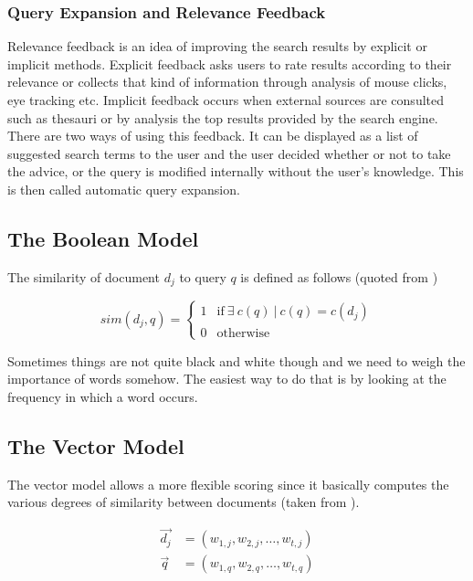 \subsubsection{Query Expansion and Relevance Feedback}

Relevance feedback is an idea of improving the search results by explicit or implicit methods. Explicit feedback asks users to rate results according to their relevance or collects that kind of information through analysis of mouse clicks, eye tracking etc. Implicit feedback occurs when external sources are consulted such as thesauri or by analysis the top results provided by the search engine. There are two ways of using this feedback. It can be displayed as a list of suggested search terms to the user and the user decided whether or not to take the advice, or the query is modified internally without the user's knowledge. This is then called automatic query expansion.

\subsection*{The Boolean Model}

The similarity of document $d_j$ to query $q$ is defined as follows (quoted from \citep[p.65]{Baeza-Yates2011})

\begin{equation}
  sim(d_j,q) =
  \begin{cases}
  1 & \text{if} \ \exists \ c(q) \ | \ c(q) = c(d_j)\\
  0 & \text{otherwise}
  \end{cases}
  \label{eq:sim}
\end{equation}

Sometimes things are not quite black and white though and we need to weigh the importance of words somehow. The easiest way to do that is by looking at the frequency in which a word occurs.

\subsection*{The Vector Model}

The vector model allows a more flexible scoring since it basically computes the various degrees of similarity between documents (taken from \citep[p.78]{Baeza-Yates2011}).

\begin{equation}
  \begin{split}
  \vec{d_j} &= (w_{1,j}, w_{2,j}, \ldots, w_{t,j})\\
  \vec{q} &= (w_{1,q}, w_{2,q}, \ldots, w_{t,q})
  \end{split}
  \label{eq:vector}
\end{equation}

